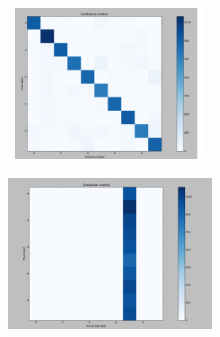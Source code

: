 \documentclass[12pt]{article}
\begin{document}
\begin{figure}[h]
\centering
\includegraphics[width=10cm, height=4cm]{3}
\end{figure}
\begin{figure}[h]
\centering
\includegraphics[width=10cm, height=4cm]{4}
\end{figure}

\newpage
\end{document}
